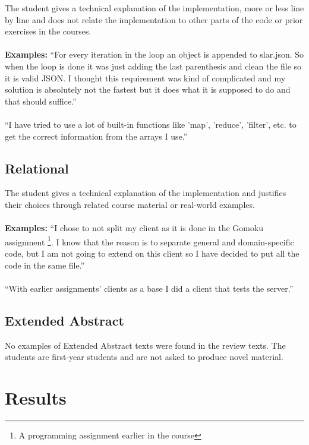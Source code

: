 \documentclass[twoside,twocolumn,a4paper,11pt,english]{article}
\begin{document}
The student gives a technical explanation of the implementation, more or less line by line and does not relate the implementation to other parts of the code or prior exercises in the courses.
\\
\\
\textbf{Examples:} ``For every iteration in the loop an object is appended to slar.json. So when the loop is done it was just adding the last parenthesis and clean the file so it is valid JSON. I thought this requirement was kind of complicated and my solution is absolutely not the fastest but it does what it is supposed to do and that should suffice.''
\\
\\
``I have tried to use a lot of built-in functions like 'map', 'reduce', 'filter', etc. to get the correct information from the arrays I use.''

\subsection{Relational}

The student gives a technical explanation of the implementation and justifies their choices through related course material or real-world examples.
\\
\\
\textbf{Examples:} ``I chose to not split my client as it is done in the Gomoku assignment \footnote{A programming assignment earlier in the course}. I know that the reason is to separate general and domain-specific code, but I am not going to extend on this client so I have decided to put all the code in the same file.''
\\
\\
``With earlier assignments' clients as a base I did a client that tests the server.''

\subsection{Extended Abstract}

No examples of Extended Abstract texts were found in the review texts. The students are first-year students and are not asked to produce novel material.




\section{Results}
\end{document}

